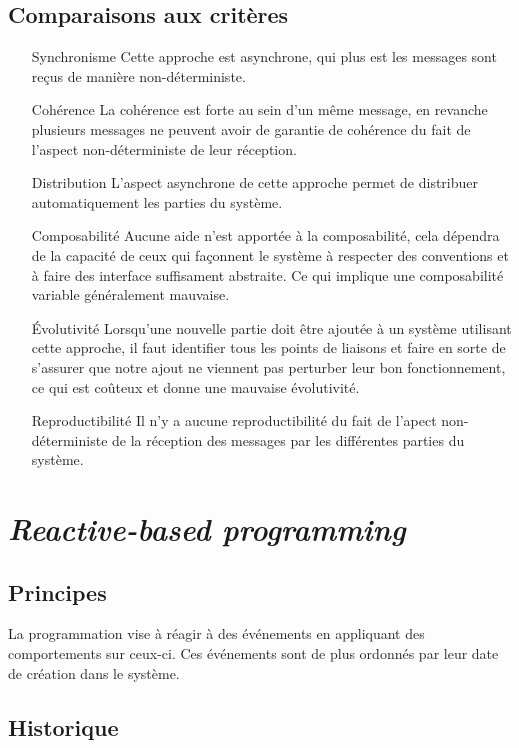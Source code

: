 \documentclass{article}
\begin{document}
\subsection{Comparaisons aux critères}
\begin{itemize}
    \item[Synchronisme] Cette approche est asynchrone, qui plus est les messages
sont reçus de  manière non-déterministe.
    \item[Cohérence] La cohérence est forte au sein d'un même message, en revanche
plusieurs messages ne peuvent avoir de garantie de cohérence du fait de l'aspect
non-déterministe de leur réception.
    \item[Distribution] L'aspect asynchrone de cette approche permet de distribuer
automatiquement les parties du système.  
    \item[Composabilité] Aucune aide n'est apportée à la composabilité, cela dépendra
de la capacité de ceux qui façonnent le système à respecter des conventions et à
faire des interface suffisament abstraite. Ce qui implique une composabilité variable
généralement mauvaise.
    \item[Évolutivité] Lorsqu'une nouvelle partie doit être ajoutée à un système
utilisant cette approche, il faut identifier tous les points de liaisons et faire
en sorte de s'assurer que notre ajout ne viennent pas perturber leur bon fonctionnement,
ce qui est coûteux et donne une mauvaise évolutivité.
    \item[Reproductibilité] Il n'y a aucune reproductibilité du fait de l'apect
non-déterministe de la réception des messages par les différentes parties du système.
\end{itemize}


\section{\emph{Reactive-based programming}}\label{reactive}

\subsection{Principes}\label{principes-1}

La programmation vise à réagir à des événements en appliquant des
comportements sur ceux-ci. Ces événements sont de plus ordonnés par
leur date de création dans le système.

\subsection{Historique}\label{historique-1}
\end{document}
